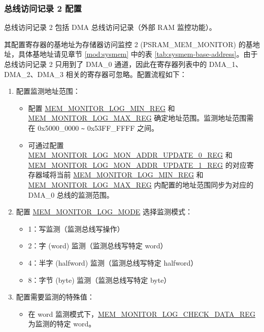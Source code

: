 \documentclass[main\_\_CN.tex]{subfiles}
\begin{document}
\subsubsection{总线访问记录 2 配置}

总线访问记录 2 包括 DMA 总线访问记录（外部 RAM 监控功能）。

其配置寄存器的基地址为存储器访问监控 2 (PSRAM\_MEM\_MONITOR) 的基地址，具体基地址请见章节 \ref{mod:sysmem} \textit{} 中的表 \ref{tab:sysmem-base-address}。由于总线访问记录 2 只用到了 DMA\_0 通道，因此在寄存器列表中的 DMA\_1、DMA\_2、DMA\_3 相关的寄存器可忽略。配置流程如下：

\begin{enumerate}
    \item 配置监测地址范围：
    \begin{itemize}
    \item 配置 \hyperref[regdesc:MEMMONITORLOGMINREG]{MEM\_MONITOR\_LOG\_MIN\_REG} 和 \hyperref[regdesc:MEMMONITORLOGMAXREG]{MEM\_MONITOR\_LOG\_MAX\_REG} 确定地址范围。监测地址范围需在 0x5000\_0000 \verb+~+ 0x53FF\_FFFF 之间。
    \item 可通过配置 \hyperref[regdesc:MEMMONITORLOGMONADDRUPDATE0REG]{MEM\_MONITOR\_LOG\_MON\_ADDR\_UPDATE\_0\_REG} 和 \hyperref[regdesc:MEMMONITORLOGMONADDRUPDATE1REG]{MEM\_MONITOR\_LOG\_MON\_ADDR\_UPDATE\_1\_REG} 的对应寄存器域将当前 \hyperref[regdesc:MEMMONITORLOGMINREG]{MEM\_MONITOR\_LOG\_MIN\_REG} 和 \hyperref[regdesc:MEMMONITORLOGMAXREG]{MEM\_MONITOR\_LOG\_MAX\_REG} 内配置的地址范围同步为对应的 DMA\_0 总线的监测范围。
    \end{itemize}
    \item 配置 \hyperref[fielddesc:MEMMONITORLOGMODE]{MEM\_MONITOR\_LOG\_MODE} 选择监测模式：
        \begin{itemize}
            \item 1：写监测（监测总线写操作）
            \item 2：字 (word) 监测（监测总线写特定 word）
            \item 4：半字 (halfword) 监测（监测总线写特定 halfword）
            \item 8：字节 (byte) 监测（监测总线写特定 byte）
        \end{itemize}
    \item 配置需要监测的特殊值：
        \begin{itemize}
            \item 在 word 监测模式下，\hyperref[regdesc:MEMMONITORLOGCHECKDATAREG]{MEM\_MONITOR\_LOG\_CHECK\_DATA\_REG} 为监测的特定 word。

\end{itemize}
\end{enumerate}
\end{document}
